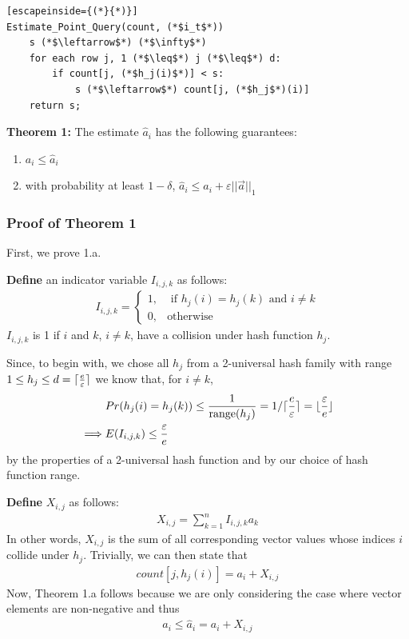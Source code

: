 \documentclass[11pt]{article}
\DeclarePairedDelimiter\ceil{\lceil}{\rceil}
\DeclarePairedDelimiter\floor{\lfloor   }{\rfloor}
\begin{document}
\begin{lstlisting}[escapeinside={(*}{*)}]
Estimate_Point_Query(count, (*$i_t$*)) 
    s (*$\leftarrow$*) (*$\infty$*)
    for each row j, 1 (*$\leq$*) j (*$\leq$*) d:
        if count[j, (*$h_j(i)$*)] < s:
            s (*$\leftarrow$*) count[j, (*$h_j$*)(i)]
    return s;
\end{lstlisting}

\textbf{Theorem 1:} The estimate $\hat a_i$ has the following guarantees:
\begin{enumerate}[label=\textnormal{(\arabic*)}]
    \item $a_i \leq \hat{a}_i$
    \item with probability at least $1 - \delta$, $\hat{a}_i \leq a_i + \varepsilon ||\vec{a}||_1$
\end{enumerate}
\subsubsection{Proof of Theorem 1}
First, we prove 1.a.  

\textbf{Define} an indicator variable $I_{i, j, k}$ as follows:
\begin{align}
    I_{i, j, k} = 
    \begin{cases}
        1, & \text{ if } h_j(i) = h_j(k) \text{ and } i \neq k \\
        0, & \text{otherwise}
    \end{cases}
\end{align}
$I_{i, j, k}$ is 1 if $i$ and $k$, $i \neq k$, have a collision under hash function $h_j$.

Since, to begin with, we chose all $h_j$ from a 2-universal hash family
with range $1 \leq h_j \leq d = \ceil{\frac{e}{\varepsilon}}$ 
we know that, for $i \neq k$,
\begin{align}\label{eq:collision-prob}
    &Pr(h_j(i) = h_j(k)) \leq \frac{1}{\text{range}(h_j)} = 1/\ceil{\frac{e}{\varepsilon}} = \floor{\frac{\varepsilon}{e}} \nonumber\\
    \implies &E(I_{i, j, k}) \leq \frac{\varepsilon}{e}
\end{align}
by the properties of a 2-universal hash function and by our choice of hash function
range.

\textbf{Define} $X_{i, j}$ as follows:
\begin{align}
    X_{i, j} = \sum_{k = 1}^{n}I_{i, j, k} a_k
\end{align}
In other words, $X_{i, j}$ is the sum of all corresponding vector values whose indices
$i$ collide under $h_j$. Trivially, we can then state that
\begin{align}\label{eq:count-def}
    count[j, h_j(i)] = a_i + X_{i, j} 
\end{align}
Now, Theorem 1.a follows because we are only considering the case where vector
elements are non-negative and thus
\begin{align}
    a_i \leq \hat a_i = a_i + X_{i, j}
\end{align}
\end{document}

